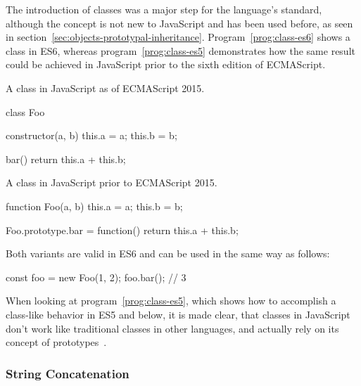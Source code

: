 The introduction of classes was a major step for the language's standard, although the concept is not new to JavaScript and has been used before, as seen in section~\ref{sec:objects-prototypal-inheritance}. Program~\ref{prog:class-es6} shows a class in ES6, whereas program~\ref{prog:class-es5} demonstrates how the same result could be achieved in JavaScript prior to the sixth edition of ECMAScript.
\begin{program}
\caption{A class in JavaScript as of ECMAScript 2015.}
\label{prog:class-es6}
\begin{JsCode}
class Foo {
  
  constructor(a, b) {
    this.a = a;
    this.b = b;
  } 
  
  bar() {
    return this.a + this.b;
  }
  
}
\end{JsCode}
\end{program}
\begin{program}
\caption{A class in JavaScript prior to ECMAScript 2015.}
\label{prog:class-es5}
\begin{JsCode}
function Foo(a, b) {
  this.a = a;
  this.b = b;
}

Foo.prototype.bar = function() {
  return this.a + this.b;
}
\end{JsCode}
\end{program}
Both variants are valid in ES6 and can be used in the same way as follows:
\begin{JsCode}[numbers=none]
const foo = new Foo(1, 2);
foo.bar(); // 3
\end{JsCode}
When looking at program~\ref{prog:class-es5}, which shows how to accomplish a class-like behavior in ES5 and below, it is made clear, that classes in JavaScript don't work like traditional classes in other languages, and actually rely on its concept of prototypes~\cite[p.~135]{YDKJS:ES6AndBeyond:Simpson:2015}.

\subsubsection{String Concatenation}


